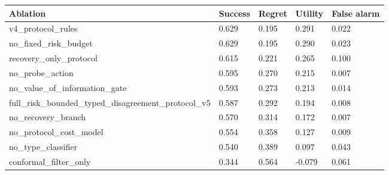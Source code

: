 \begin{tabular}{lllll}
\toprule
Ablation & Success & Regret & Utility & False alarm \\
\midrule
v4\_protocol\_rules & 0.629 & 0.195 & 0.291 & 0.022 \\
no\_fixed\_risk\_budget & 0.629 & 0.195 & 0.290 & 0.023 \\
recovery\_only\_protocol & 0.615 & 0.221 & 0.265 & 0.100 \\
no\_probe\_action & 0.595 & 0.270 & 0.215 & 0.007 \\
no\_value\_of\_information\_gate & 0.593 & 0.273 & 0.213 & 0.014 \\
full\_risk\_bounded\_typed\_disagreement\_protocol\_v5 & 0.587 & 0.292 & 0.194 & 0.008 \\
no\_recovery\_branch & 0.570 & 0.314 & 0.172 & 0.007 \\
no\_protocol\_cost\_model & 0.554 & 0.358 & 0.127 & 0.009 \\
no\_type\_classifier & 0.540 & 0.389 & 0.097 & 0.043 \\
conformal\_filter\_only & 0.344 & 0.564 & -0.079 & 0.061 \\
\bottomrule
\end{tabular}
